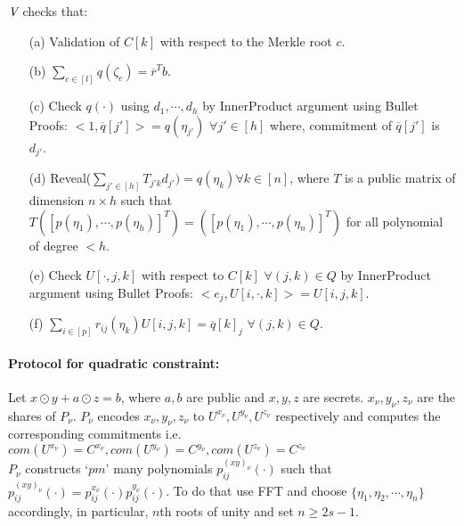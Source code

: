 $\textit{V}$ checks that:\\
\begin{itemize}
	\item[(a)] Validation of $C[k]$ with respect to the Merkle root $c$.
	\item[(b)] $\sum\limits_{c\in[l]} q(\zeta_c)=\overline{r}^Tb$.
	\item[(c)] Check $q(\cdot)$ using $d_1,\cdots, d_h$ by InnerProduct argument using Bullet Proofs: $<1, \overline{q}[j']>= q(\eta_{j'})$ $\forall j'\in [h]$ where, commitment of $\overline{q}[j']$ is $d_{j'}$.
	\item[(d)] Reveal($\sum\limits_{j'\in[h]} T_{j'k}d_{j'})=q(\eta_k) \forall k\in[n]$, where $T$ is a public matrix of dimension $n\times h$ such that $T([p(\eta_1),\cdots,p(\eta_h)]^T)=([p(\eta_1),\cdots,p(\eta_n)]^T)$ for all polynomial of degree $<h$.
	\item[(e)] Check $U[\cdot,j,k]$ with respect to $C[k]$ $\forall (j,k)\in Q$ by InnerProduct argument using Bullet Proofs: $<e_j,U[i,\cdot,k]>=U[i,j,k]$.
	\item[(f)] $\sum\limits_{i\in [p]} r_{ij}(\eta_k)U[i,j,k]=\overline{q}[k]_j$ $\forall (j,k)\in Q$.
\end{itemize}

\paragraph{Protocol for quadratic constraint:} Let $x\odot y+a\odot z=b$, where $a,b$ are public and $x,y,z$ are secrets. $x_{\nu}, y_{\nu}, z_{\nu}$ are the shares of $P_{\nu}$. $P_{\nu}$ encodes $x_{\nu},y_{\nu},z_{\nu}$ to $U^{x_{\nu}},U^{y_{\nu}}, U^{z_{\nu}}$ respectively and computes the corresponding commitments i.e. $com(U^{x_{\nu}})=C^{x_{\nu}}, com(U^{y_{\nu}})=C^{y_{\nu}}, com(U^{z_{\nu}})=C^{z_{\nu}}$\\
$P_{\nu}$ constructs `$pm$' many polynomials $p^{(xy)_{\nu}}_{ij}(\cdot)$ such that $p^{(xy)_{\nu}}_{ij}(\cdot)= p^{x_{\nu}}_{ij}(\cdot)p^{y_{\nu}}_{ij}(\cdot)$. To do that use FFT and choose $\{\eta_1,\eta_2,\cdots,\eta_n\}$ accordingly, in particular, $n$th roots of unity and set $n\geq 2s-1$.\\

